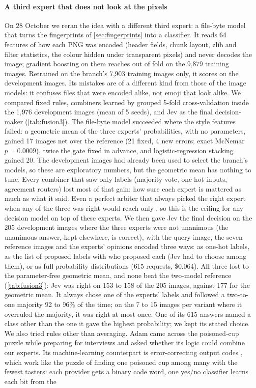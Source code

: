 \paragraph{A third expert that does not look at the pixels} On 28 October we reran the idea with a different third expert: a file-byte model that turns the fingerprints of \cref{sec:fingerprints} into a classifier. It reads 64 features of how each PNG was encoded (header fields, chunk layout, zlib and filter statistics, the colour hidden under transparent pixels) and never decodes the image; gradient boosting on them reaches  out of fold on the 9{,}879 training images. Retrained on the branch's 7{,}903 training images only, it scores  on the development images. Its mistakes are of a different kind from those of the image models: it confuses files that were encoded alike, not emoji that look alike. We compared fixed rules, combiners learned by grouped 5-fold cross-validation inside the 1{,}976 development images (mean of 5 seeds), and Jev as the final decision-maker (\cref{tab:fusion3}). The file-byte model succeeded where the style features failed: a geometric mean of the three experts' probabilities, with no parameters, gained 17 images net over the reference (21 fixed, 4 new errors; exact McNemar $p=0.0009$), twice the gate fixed in advance, and logistic-regression stacking gained 20. The development images had already been used to select the branch's models, so these are exploratory numbers, but the geometric mean has nothing to tune. Every combiner that saw only labels (majority vote, one-hot inputs, agreement routers) lost most of that gain: how sure each expert is mattered as much as what it said. Even a perfect arbiter that always picked the right expert when any of the three was right would reach only , so this is the ceiling for any decision model on top of these experts. We then gave Jev the final decision on the 205 development images where the three experts were not unanimous (the unanimous answer, kept elsewhere, is  correct), with the query image, the seven reference images and the experts' opinions encoded three ways: as one-hot labels, as the list of proposed labels with who proposed each (Jev had to choose among them), or as full probability distributions (615 requests, \$0.064). All three lost to the parameter-free geometric mean, and none beat the two-model reference (\cref{tab:fusion3}): Jev was right on 153 to 158 of the 205 images, against 177 for the geometric mean. It always chose one of the experts' labels and followed a two-to-one majority 92 to 96\% of the time; on the 7 to 15 images per variant where it overruled the majority, it was right at most once. One of its 615 answers named a class other than the one it gave the highest probability; we kept its stated choice. We also tried rules other than averaging. Adam came across the poisoned-cup puzzle while preparing for interviews and asked whether its logic could combine our experts. Its machine-learning counterpart is error-correcting output codes \cite{dietterich1995ecoc}, which work like the puzzle of finding one poisoned cup among many with the fewest tasters: each provider gets a binary code word, one yes/no classifier learns each bit from the 